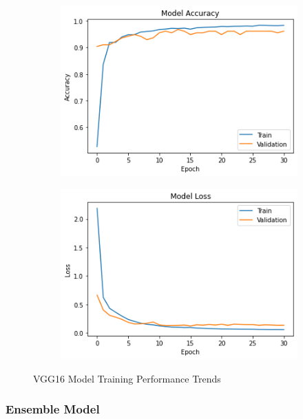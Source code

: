 \begin{figure}[H]
        \begin{subfigure}[b]{0.5\textwidth}
                \includegraphics[width=\linewidth]{Images/VGGAcc.png}
        \end{subfigure}%
        \begin{subfigure}[b]{0.5\textwidth}
                \includegraphics[width=\linewidth]{Images/VGGLoss.png}
        \end{subfigure}%
        \caption{VGG16 Model Training Performance Trends}\label{fig:vggModelTraining}
\end{figure}


\subsubsection{Ensemble Model}

